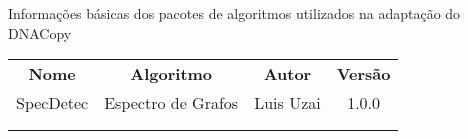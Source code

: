 
\begin{quadro}[ht]
 \centering
 \caption{Informações básicas dos pacotes de algoritmos utilizados na adaptação do DNACopy\label{qua:quadro-2-algoritmos}}
 {\renewcommand\arraystretch{1.25}
 \begin{tabular}{ l l l l }
  \cline{1-1}\cline{2-2}\cline{3-3}\cline{4-4}  
    \multicolumn{1}{|c|}{\textbf{Nome} \centering } &
    \multicolumn{1}{c|}{\textbf{Algoritmo} \centering } &
    \multicolumn{1}{c|}{\textbf{Autor} \centering } &
    \multicolumn{1}{c|}{\textbf{Versão} \centering }
  \\  
  \cline{1-1}\cline{2-2}\cline{3-3}\cline{4-4}  
    \multicolumn{1}{|c|}{SpecDetec} &
    \multicolumn{1}{c|}{Espectro de Grafos} &
    \multicolumn{1}{c|}{Luis Uzai} &
    \multicolumn{1}{c|}{1.0.0}
  \\  
  \cline{1-1}\cline{2-2}\cline{3-3}\cline{4-4}  
    \multicolumn{1}{|c|}{ } &
    \multicolumn{1}{c|}{ } &
    \multicolumn{1}{c|}{ } &
    \multicolumn{1}{c|}{ }
  \\  
  \cline{1-1}\cline{2-2}\cline{3-3}\cline{4-4}  
    \multicolumn{1}{|c|}{ } &
    \multicolumn{1}{c|}{ } &
    \multicolumn{1}{c|}{ } &
    \multicolumn{1}{c|}{ }
  \\  
  \hline

 \end{tabular}
 }
\end{quadro}
